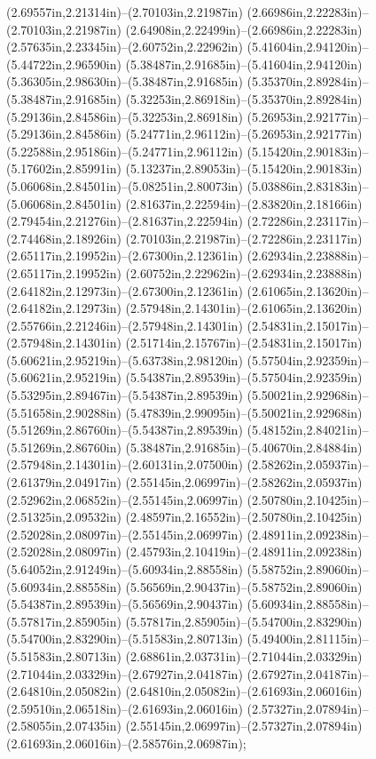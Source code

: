 (2.69557in,2.21314in)--(2.70103in,2.21987in) (2.66986in,2.22283in)--(2.70103in,2.21987in) (2.64908in,2.22499in)--(2.66986in,2.22283in) (2.57635in,2.23345in)--(2.60752in,2.22962in) (5.41604in,2.94120in)--(5.44722in,2.96590in) (5.38487in,2.91685in)--(5.41604in,2.94120in) (5.36305in,2.98630in)--(5.38487in,2.91685in) (5.35370in,2.89284in)--(5.38487in,2.91685in) (5.32253in,2.86918in)--(5.35370in,2.89284in) (5.29136in,2.84586in)--(5.32253in,2.86918in) (5.26953in,2.92177in)--(5.29136in,2.84586in) (5.24771in,2.96112in)--(5.26953in,2.92177in) (5.22588in,2.95186in)--(5.24771in,2.96112in) (5.15420in,2.90183in)--(5.17602in,2.85991in) (5.13237in,2.89053in)--(5.15420in,2.90183in) (5.06068in,2.84501in)--(5.08251in,2.80073in) (5.03886in,2.83183in)--(5.06068in,2.84501in) (2.81637in,2.22594in)--(2.83820in,2.18166in) (2.79454in,2.21276in)--(2.81637in,2.22594in) (2.72286in,2.23117in)--(2.74468in,2.18926in) (2.70103in,2.21987in)--(2.72286in,2.23117in) (2.65117in,2.19952in)--(2.67300in,2.12361in) (2.62934in,2.23888in)--(2.65117in,2.19952in) (2.60752in,2.22962in)--(2.62934in,2.23888in) (2.64182in,2.12973in)--(2.67300in,2.12361in) (2.61065in,2.13620in)--(2.64182in,2.12973in) (2.57948in,2.14301in)--(2.61065in,2.13620in) (2.55766in,2.21246in)--(2.57948in,2.14301in) (2.54831in,2.15017in)--(2.57948in,2.14301in) (2.51714in,2.15767in)--(2.54831in,2.15017in) (5.60621in,2.95219in)--(5.63738in,2.98120in) (5.57504in,2.92359in)--(5.60621in,2.95219in) (5.54387in,2.89539in)--(5.57504in,2.92359in) (5.53295in,2.89467in)--(5.54387in,2.89539in) (5.50021in,2.92968in)--(5.51658in,2.90288in) (5.47839in,2.99095in)--(5.50021in,2.92968in) (5.51269in,2.86760in)--(5.54387in,2.89539in) (5.48152in,2.84021in)--(5.51269in,2.86760in) (5.38487in,2.91685in)--(5.40670in,2.84884in) (2.57948in,2.14301in)--(2.60131in,2.07500in) (2.58262in,2.05937in)--(2.61379in,2.04917in) (2.55145in,2.06997in)--(2.58262in,2.05937in) (2.52962in,2.06852in)--(2.55145in,2.06997in) (2.50780in,2.10425in)--(2.51325in,2.09532in) (2.48597in,2.16552in)--(2.50780in,2.10425in) (2.52028in,2.08097in)--(2.55145in,2.06997in) (2.48911in,2.09238in)--(2.52028in,2.08097in) (2.45793in,2.10419in)--(2.48911in,2.09238in) (5.64052in,2.91249in)--(5.60934in,2.88558in) (5.58752in,2.89060in)--(5.60934in,2.88558in) (5.56569in,2.90437in)--(5.58752in,2.89060in) (5.54387in,2.89539in)--(5.56569in,2.90437in) (5.60934in,2.88558in)--(5.57817in,2.85905in) (5.57817in,2.85905in)--(5.54700in,2.83290in) (5.54700in,2.83290in)--(5.51583in,2.80713in) (5.49400in,2.81115in)--(5.51583in,2.80713in) (2.68861in,2.03731in)--(2.71044in,2.03329in) (2.71044in,2.03329in)--(2.67927in,2.04187in) (2.67927in,2.04187in)--(2.64810in,2.05082in) (2.64810in,2.05082in)--(2.61693in,2.06016in) (2.59510in,2.06518in)--(2.61693in,2.06016in) (2.57327in,2.07894in)--(2.58055in,2.07435in) (2.55145in,2.06997in)--(2.57327in,2.07894in) (2.61693in,2.06016in)--(2.58576in,2.06987in);
